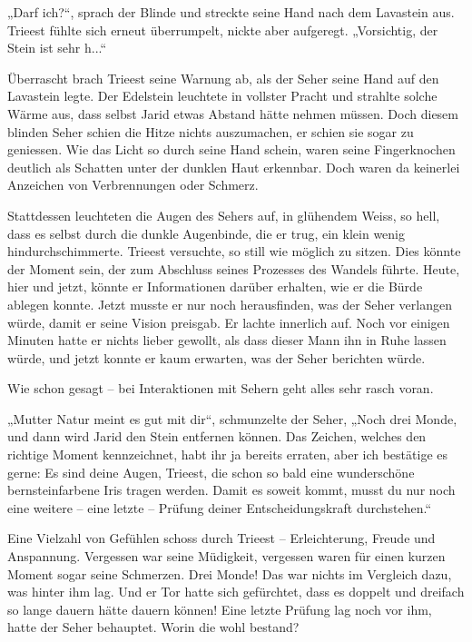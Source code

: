 „Darf ich?“, sprach der Blinde und streckte seine Hand nach dem Lavastein aus. Trieest fühlte sich erneut überrumpelt, nickte aber aufgeregt. „Vorsichtig, der Stein ist sehr h...“

Überrascht brach Trieest seine Warnung ab, als der Seher seine Hand auf den Lavastein legte. Der Edelstein leuchtete in vollster Pracht und strahlte solche Wärme aus, dass selbst Jarid etwas Abstand hätte nehmen müssen. Doch diesem blinden Seher schien die Hitze nichts auszumachen, er schien sie sogar zu geniessen. Wie das Licht so durch seine Hand schein, waren seine Fingerknochen deutlich als Schatten unter der dunklen Haut erkennbar. Doch waren da keinerlei Anzeichen von Verbrennungen oder Schmerz.

Stattdessen leuchteten die Augen des Sehers auf, in glühendem Weiss, so hell, dass es selbst durch die dunkle Augenbinde, die er trug, ein klein wenig hindurchschimmerte. Trieest versuchte, so still wie möglich zu sitzen. Dies könnte der Moment sein, der zum Abschluss seines Prozesses des Wandels führte. Heute, hier und jetzt, könnte er Informationen darüber erhalten, wie er die Bürde ablegen konnte. Jetzt musste er nur noch herausfinden, was der Seher verlangen würde, damit er seine Vision preisgab. Er lachte innerlich auf. Noch vor einigen Minuten hatte er nichts lieber gewollt, als dass dieser Mann ihn in Ruhe lassen würde, und jetzt konnte er kaum erwarten, was der Seher berichten würde.

Wie schon gesagt – bei Interaktionen mit Sehern geht alles sehr rasch voran.

„Mutter Natur meint es gut mit dir“, schmunzelte der Seher, „Noch drei Monde, und dann wird Jarid den Stein entfernen können. Das Zeichen, welches den richtige Moment kennzeichnet, habt ihr ja bereits erraten, aber ich bestätige es gerne: Es sind deine Augen, Trieest, die schon so bald eine wunderschöne bernsteinfarbene Iris tragen werden. Damit es soweit kommt, musst du nur noch eine weitere – eine letzte – Prüfung deiner Entscheidungskraft durchstehen.“

Eine Vielzahl von Gefühlen schoss durch Trieest – Erleichterung, Freude und Anspannung. Vergessen war seine Müdigkeit, vergessen waren für einen kurzen Moment sogar seine Schmerzen. Drei Monde! Das war nichts im Vergleich dazu, was hinter ihm lag. Und er Tor hatte sich gefürchtet, dass es doppelt und dreifach so lange dauern hätte dauern können! Eine letzte Prüfung lag noch vor ihm, hatte der Seher behauptet. Worin die wohl bestand?

